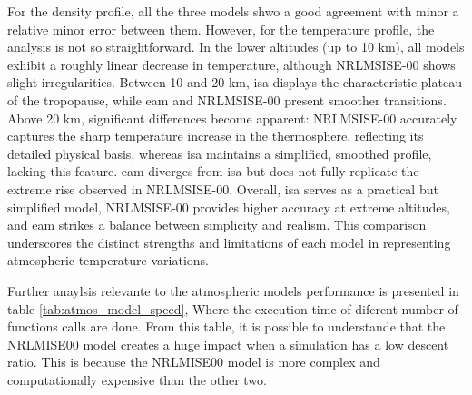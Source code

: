 For the density profile, all the three models shwo a good agreement with minor a relative minor error between them. However, for the temperature profile, the analysis is not so straightforward. In the lower altitudes (up to 10 km), all models exhibit a roughly linear decrease in temperature, although NRLMSISE-00 shows slight irregularities. Between 10 and 20 km, \gls{isa} displays the characteristic plateau of the tropopause, while \gls{eam} and NRLMSISE-00 present smoother transitions. Above 20 km, significant differences become apparent: NRLMSISE-00 accurately captures the sharp temperature increase in the thermosphere, reflecting its detailed physical basis, whereas \gls{isa} maintains a simplified, smoothed profile, lacking this feature. \gls{eam} diverges from \gls{isa} but does not fully replicate the extreme rise observed in NRLMSISE-00. Overall, \gls{isa} serves as a practical but simplified model, NRLMSISE-00 provides higher accuracy at extreme altitudes, and \gls{eam} strikes a balance between simplicity and realism. This comparison underscores the distinct strengths and limitations of each model in representing atmospheric temperature variations.

Further anaylsis relevante to the atmospheric models performance is presented in table \ref{tab:atmos_model_speed}, Where the execution time of diferent number of functions calls are done. From this table, it is possible to understande that the NRLMISE00 model creates a huge impact when a simulation has a low descent ratio. This is because the NRLMISE00 model is more complex and computationally expensive than the other two.

